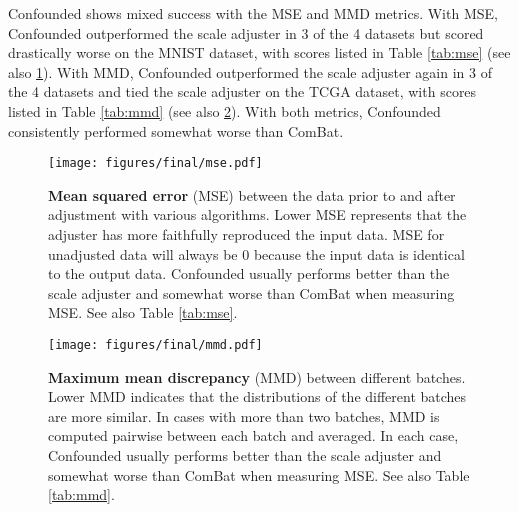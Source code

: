 Confounded shows mixed success with the MSE and MMD metrics.
With MSE, Confounded outperformed the scale adjuster in 3 of the 4 datasets but scored drastically worse on the MNIST dataset, with scores listed in Table \ref{tab:mse} (see also \figurename{} \ref{fig:mse}).
With MMD, Confounded outperformed the scale adjuster again in 3 of the 4 datasets and tied the scale adjuster on the TCGA dataset, with scores listed in Table \ref{tab:mmd} (see also \figurename{} \ref{fig:mmd}).
With both metrics, Confounded consistently performed somewhat worse than ComBat.

\begin{figure}
	\centering
	\texttt{[image: figures/final/mse.pdf]}
	\caption[Mean squared error (MSE)]{
		\textbf{Mean squared error} (MSE) between the data prior to and after adjustment with various algorithms.
		Lower MSE represents that the adjuster has more faithfully reproduced the input data.
		MSE for unadjusted data will always be 0 because the input data is identical to the output data.
		Confounded usually performs better than the scale adjuster and somewhat worse than ComBat when measuring MSE.
		See also Table \ref{tab:mse}.
	}
	\label{fig:mse}
\end{figure}
\begin{table}
	
	\caption[Mean squared error (MSE)]{
		\textbf{Mean squared error (MSE)} of the unadjusted input data compared to the data output by the given adjusters.
		Lower MSE indicates that the output has changed less from the input.
		See also \figurename{} \ref{fig:mse}.
	}
	\label{tab:mse}
\end{table}
\begin{figure}
	\centering
	\texttt{[image: figures/final/mmd.pdf]}
	\caption[Maximum mean discrepancy (MMD)]{
		\textbf{Maximum mean discrepancy} (MMD) between different batches.
		Lower MMD indicates that the distributions of the different batches are more similar.
		In cases with more than two batches, MMD is computed pairwise between each batch and averaged.
		In each case, Confounded usually performs better than the scale adjuster and somewhat worse than ComBat when measuring MSE.
		See also Table \ref{tab:mmd}.
	}
	\label{fig:mmd}
\end{figure}
\begin{table}
	\centering
	
	\caption[Maximum mean discrepancy (MMD)]{
		\textbf{Maximum mean discrepancy} (MMD) comparing the distributions of the batches to each other after a given adjustment.
		Lower MMD indicates that the distributions of the different batches are more similar.
		In cases with more than two batches, MMD is computed pairwise between each batch and averaged.
		See also \figurename{} \ref{fig:mmd}.
	}
	\label{tab:mmd}
\end{table}

